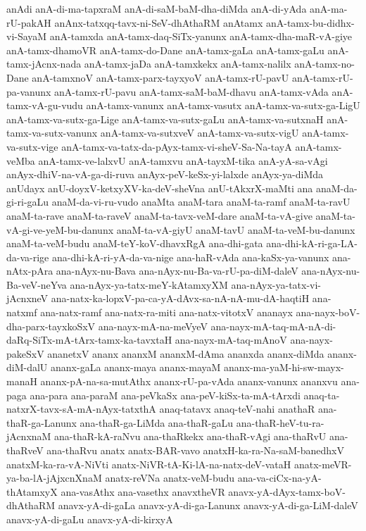 {anAdi
anA-di-ma-tapxraM
anA-di-saM-baM-dha-diMda
anA-di-yAda
anA-ma-rU-pakAH
anAnx-tatxqq-tavx-ni-SeV-dhAthaRM
anAtamx
anA-tamx-bu-didhx-vi-SayaM
anA-tamxda
anA-tamx-daq-SiTx-yanunx
anA-tamx-dha-maR-vA-giye
anA-tamx-dhamoVR
anA-tamx-do-Dane
anA-tamx-gaLa
anA-tamx-gaLu
anA-tamx-jAcnx-nada
anA-tamx-jaDa
anA-tamxkekx
anA-tamx-nalilx
anA-tamx-no-Dane
anA-tamxnoV
anA-tamx-parx-tayxyoV
anA-tamx-rU-pavU
anA-tamx-rU-pa-vanunx
anA-tamx-rU-pavu
anA-tamx-saM-baM-dhavu
anA-tamx-vAda
anA-tamx-vA-gu-vudu
anA-tamx-vanunx
anA-tamx-vasutx
anA-tamx-va-sutx-ga-LigU
anA-tamx-va-sutx-ga-Lige
anA-tamx-va-sutx-gaLu
anA-tamx-va-sutxnaH
anA-tamx-va-sutx-vanunx
anA-tamx-va-sutxveV
anA-tamx-va-sutx-vigU
anA-tamx-va-sutx-vige
anA-tamx-va-tatx-da-pAyx-tamx-vi-sheV-Sa-Na-tayA
anA-tamx-veMba
anA-tamx-ve-lalxvU
anA-tamxvu
anA-tayxM-tika
anA-yA-sa-vAgi
anAyx-dhiV-na-vA-ga-di-ruva
anAyx-peV-keSx-yi-lalxde
anAyx-ya-diMda
anUdayx
anU-doyxV-ketxyXV-ka-deV-sheVna
anU-tAkxrX-maMti
ana
anaM-da-gi-ri-gaLu
anaM-da-vi-ru-vudo
anaMta
anaM-tara
anaM-ta-ramf
anaM-ta-ravU
anaM-ta-rave
anaM-ta-raveV
anaM-ta-tavx-veM-dare
anaM-ta-vA-give
anaM-ta-vA-gi-ve-yeM-bu-danunx
anaM-ta-vA-giyU
anaM-tavU
anaM-ta-veM-bu-danunx
anaM-ta-veM-budu
anaM-teY-koV-dhavxRgA
ana-dhi-gata
ana-dhi-kA-ri-ga-LA-da-va-rige
ana-dhi-kA-ri-yA-da-va-nige
ana-haR-vAda
ana-kaSx-ya-vanunx
ana-nAtx-pAra
ana-nAyx-nu-Bava
ana-nAyx-nu-Ba-va-rU-pa-diM-daleV
ana-nAyx-nu-Ba-veV-neYva
ana-nAyx-ya-tatx-meY-kAtamxyXM
ana-nAyx-ya-tatx-vi-jAcnxneV
ana-natx-ka-lopxV-pa-ca-yA-dAvx-sa-nA-nA-mu-dA-haqtiH
ana-natxmf
ana-natx-ramf
ana-natx-ra-miti
ana-natx-vitotxV
ananayx
ana-nayx-boV-dha-parx-tayxkoSxV
ana-nayx-mA-na-meVyeV
ana-nayx-mA-taq-mA-nA-di-daRq-SiTx-mA-tArx-tamx-ka-tavxtaH
ana-nayx-mA-taq-mAnoV
ana-nayx-pakeSxV
ananetxV
ananx
ananxM
ananxM-dAma
ananxda
ananx-diMda
ananx-diM-dalU
ananx-gaLa
ananx-maya
ananx-mayaM
ananx-ma-yaM-hi-sw-mayx-manaH
ananx-pA-na-sa-mutAthx
ananx-rU-pa-vAda
ananx-vanunx
ananxvu
ana-paga
ana-para
ana-paraM
ana-peVkaSx
ana-peV-kiSx-ta-mA-tArxdi
anaq-ta-natxrX-tavx-sA-mA-nAyx-tatxthA
anaq-tatavx
anaq-teV-nahi
anathaR
ana-thaR-ga-Lanunx
ana-thaR-ga-LiMda
ana-thaR-gaLu
ana-thaR-heV-tu-ra-jAcnxnaM
ana-thaR-kA-raNvu
ana-thaRkekx
ana-thaR-vAgi
ana-thaRvU
ana-thaRveV
ana-thaRvu
anatx
anatx-BAR-vavo
anatxH-ka-ra-Na-saM-banedhxV
anatxM-ka-ra-vA-NiVti
anatx-NiVR-tA-Ki-lA-na-natx-deV-vataH
anatx-meVR-ya-ba-lA-jAjxcnXnaM
anatx-reVNa
anatx-veM-budu
ana-va-ciCx-na-yA-thAtamxyX
ana-vasAthx
ana-vasethx
anavxtheVR
anavx-yA-dAyx-tamx-boV-dhAthaRM
anavx-yA-di-gaLa
anavx-yA-di-ga-Lanunx
anavx-yA-di-ga-LiM-daleV
anavx-yA-di-gaLu
anavx-yA-di-kirxyA
}
